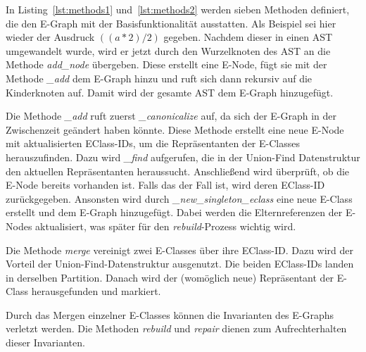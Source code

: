 In Listing~\ref{lst:methods1} und~\ref{lst:methods2} werden sieben Methoden definiert, die den E-Graph mit der Basisfunktionalität ausstatten.
Als Beispiel sei hier wieder der Ausdruck $((a * 2) / 2)$ gegeben. Nachdem dieser in einen AST umgewandelt wurde, wird er jetzt durch den
Wurzelknoten des AST an die Methode \textit{add\_node} übergeben. Diese erstellt eine E-Node, fügt sie mit der Methode \textit{\_add}
dem E-Graph hinzu und ruft sich dann rekursiv auf die Kinderknoten auf. Damit wird der gesamte AST dem E-Graph hinzugefügt.

Die Methode \textit{\_add} ruft zuerst \textit{\_canonicalize} auf, da sich der E-Graph in der Zwischenzeit geändert haben könnte.
Diese Methode erstellt eine neue E-Node mit aktualisierten EClass-IDs, um die Repräsentanten der E-Classes herauszufinden.
Dazu wird \textit{\_find} aufgerufen, die in der Union-Find Datenstruktur den aktuellen Repräsentanten heraussucht.
Anschließend wird überprüft, ob die E-Node bereits vorhanden ist. Falls das der Fall ist, wird deren EClass-ID zurückgegeben.
Ansonsten wird durch \textit{\_new\_singleton\_eclass} eine neue E-Class erstellt und dem E-Graph hinzugefügt. Dabei werden die Elternreferenzen
der E-Nodes aktualisiert, was später für den \textit{rebuild}-Prozess wichtig wird.

Die Methode \textit{merge} vereinigt zwei E-Classes über ihre EClass-ID. Dazu wird der Vorteil der Union-Find-Datenstruktur ausgenutzt. Die beiden EClass-IDs
landen in derselben Partition. Danach wird der (womöglich neue) Repräsentant der E-Class herausgefunden und markiert.

Durch das Mergen einzelner E-Classes können die Invarianten des E-Graphs verletzt werden. Die Methoden \textit{rebuild} und \textit{repair} dienen zum Aufrechterhalten
dieser Invarianten.

